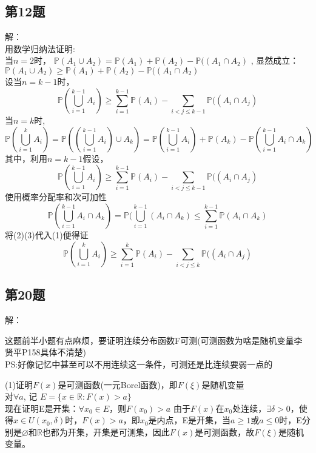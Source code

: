 \documentclass[10pt,a4paper]{article}
\begin{document}
\subsection{第12题}
解：\\ 
用数学归纳法证明:\\
当$n=2$时， $ \mathbb{P}(A_{1} \cup A_{2})=\mathbb{P}(A_{1}) + \mathbb{P}(A_{2}) - \mathbb{P}((A_{1} \cap A_{2})  $ , 显然成立：$ \mathbb{P}(A_{1} \cup A_{2}) \geq \mathbb{P}(A_{1}) + \mathbb{P}(A_{2}) - \mathbb{P}((A_{1} \cap A_{2})  $ \\
设当$n=k-1$时，\[ \mathbb{P}(\bigcup_{i=1}^{k-1} A_{i}) \geq \sum_{i=1}^{k-1} \mathbb{P}(A_{i})-\sum_{i<j \leq k-1} \mathbb{P}((A_{i} \cap A_{j}) \]
当$n=k$时,
\[ 
\mathbb{P}(\bigcup_{i=1}^{k} A_{i})=\mathbb{P}((\bigcup_{i=1}^{k-1} A_{i}) \cup A_{k})=\mathbb{P}(\bigcup_{i=1}^{k-1} A_{i})+\mathbb{P}(A_{k})-\mathbb{P}(\bigcup_{i=1}^{k-1} A_{i} \cap A_{k})
\tag{1}
\]
其中，利用$n=k-1$假设，
\[ \mathbb{P}(\bigcup_{i=1}^{k-1} A_{i}) \geq \sum_{i=1}^{k-1} \mathbb{P}(A_{i})-\sum_{i<j \leq k-1} \mathbb{P}((A_{i} \cap A_{j}) 
\tag{2}
\]
使用概率分配率和次可加性
\[ \mathbb{P}(\bigcup_{i=1}^{k-1} A_{i} \cap A_{k}) = \mathbb{P}(\bigcup_{i=1}^{k-1} (A_{i} \cap A_{k}) \leq \sum_{i=1}^{k-1}\mathbb{P}(A_{i} \cap A_{k}) 
\tag{3}
\] 
将(2)(3)代入(1)便得证
\[ \mathbb{P}(\bigcup_{i=1}^{k} A_{i}) \geq \sum_{i=1}^{k} \mathbb{P}(A_{i})-\sum_{i<j \leq k} \mathbb{P}((A_{i} \cap A_{j}) \]


\subsection{第20题}
解：\\ 
\begin{shaded}
	
	这题前半小题有点麻烦，要证明连续分布函数F可测(可测函数为啥是随机变量李贤平P158具体不清楚)\\
	PS:好像记忆中甚至可以不用连续这一条件，可测还是比连续要弱一点的
	
\end{shaded}
(1)证明$F(x)$是可测函数(一元Borel函数)，即$F(\xi)$是随机变量\\
对$ \forall a$, 记 $E = \{x \in \mathbb{R} \colon F(x)>a \}  $ \\
现在证明E是开集：$ \forall x_{0} \in E$，则$F(x_{0})>a$ 由于$F(x)$在$x_{0}$处连续，$ \exists \delta>0$，使得$x \in U(x_{0}, \delta)$时，$F(x)>a$，即$x_{0}$是内点，E是开集，当$a \geq 1$或$a \leq 0$时，E分别是$\varnothing$和$\mathbb{R}$也都为开集，开集是可测集，因此$F(x)$是可测函数，故$F(\xi)$是随机变量。\\
\end{document}
